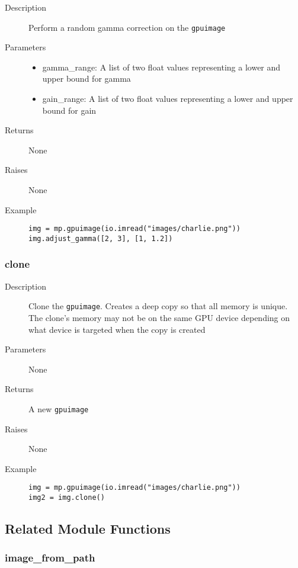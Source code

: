 \begin{description}
   \item[Description] Perform a random gamma correction on the \verb|gpuimage|
   \item[Parameters] \phantom{}
   \begin{itemize}
   \item gamma\_range: A list of two float values representing a lower and upper bound for gamma
   \item gain\_range: A list of two float values representing a lower and upper bound for gain
   \end{itemize}
   \item[Returns] None
   \item[Raises] None
   \item[Example] \phantom{}
   \begin{lstlisting}
img = mp.gpuimage(io.imread("images/charlie.png"))
img.adjust_gamma([2, 3], [1, 1.2])
\end{lstlisting}
\end{description}

\subsubsection{clone}

\begin{description}
   \item[Description] Clone the \verb|gpuimage|. Creates a deep copy so that all memory is unique. The clone's memory may not be on the same GPU device depending on what device is targeted when the copy is created
   \item[Parameters] None
   \item[Returns] A new \verb|gpuimage|
   \item[Raises] None
   \item[Example] \phantom{}
   \begin{lstlisting}
img = mp.gpuimage(io.imread("images/charlie.png"))
img2 = img.clone()
\end{lstlisting}
\end{description}

\subsection{Related Module Functions}

\subsubsection{image\_from\_path}

